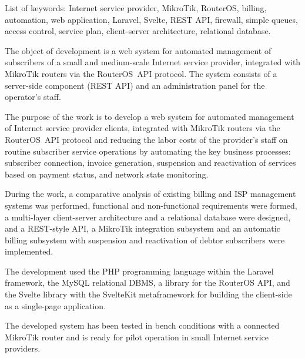 List of keywords: Internet service provider, MikroTik, RouterOS, billing, automation, web application, Laravel, Svelte, REST API, firewall, simple queues, access control, service plan, client-server architecture, relational database.

The object of development is a web system for automated management of subscribers of a small and medium-scale Internet service provider, integrated with MikroTik routers via the RouterOS~API protocol. The system consists of a server-side component (REST API) and an administration panel for the operator's staff.

The purpose of the work is to develop a web system for automated management of Internet service provider clients, integrated with MikroTik routers via the RouterOS~API protocol and reducing the labor costs of the provider's staff on routine subscriber service operations by automating the key business processes: subscriber connection, invoice generation, suspension and reactivation of services based on payment status, and network state monitoring.

During the work, a comparative analysis of existing billing and ISP management systems was performed, functional and non-functional requirements were formed, a multi-layer client-server architecture and a relational database were designed, and a REST-style API, a MikroTik integration subsystem and an automatic billing subsystem with suspension and reactivation of debtor subscribers were implemented.

The development used the PHP programming language within the Laravel framework, the MySQL relational DBMS, a library for the RouterOS API, and the Svelte library with the SvelteKit metaframework for building the client-side as a single-page application.

The developed system has been tested in bench conditions with a connected MikroTik router and is ready for pilot operation in small Internet service providers.

